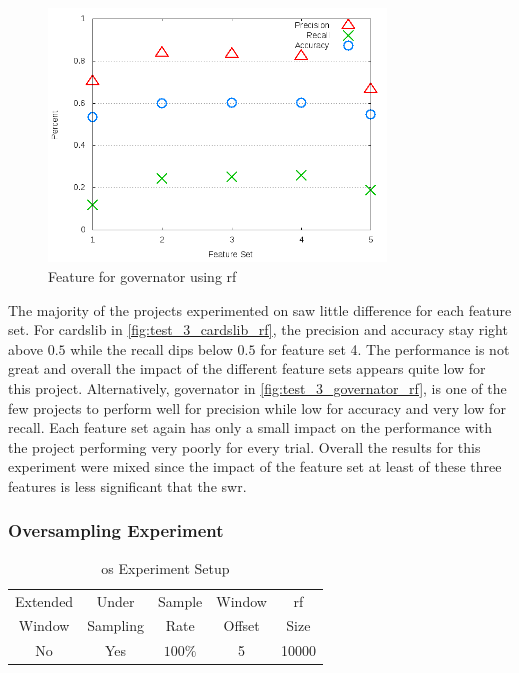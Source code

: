 \begin{figure}[!ht]
    \centering
        \includegraphics[width=0.8\textwidth]{images/rf/test_3/governator_sample_range}
    \caption{Feature for governator using \gls{rf}}
    \label{fig:test_3_governator_rf}
\end{figure}

The majority of the projects experimented on saw little difference for each feature set. For cardslib in \autoref{fig:test_3_cardslib_rf}, the precision and accuracy stay right above $0.5$ while the recall dips below $0.5$ for feature set 4. The performance is not great and overall the impact of the different feature sets appears quite low for this project. Alternatively, governator in \autoref{fig:test_3_governator_rf}, is one of the few projects to perform well for precision while low for accuracy and very low for recall. Each feature set again has only a small impact on the performance with the project performing very poorly for every trial. Overall the results for this experiment were mixed since the impact of the feature set at least of these three features is less significant that the \gls{swr}.

\subsubsection{Oversampling Experiment}
\label{sec:oversampling_experiment_rf}

\begin{table}[h]
\begin{center}

    \begin{tabular}{|c|c|c|c|c|}
        \hline
        Extended & Under & Sample & Window & \gls{rf} \\
        Window & Sampling & Rate & Offset & Size \\ \hline
        No & Yes & $100\%$ & 5 & 10000 \\ \hline
    \end{tabular}
    \caption{\gls{os} Experiment Setup}
    \label{tab:rf_os_experiment_setup}
\end{center}

\end{table}


